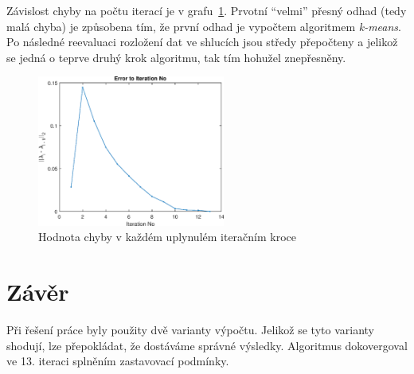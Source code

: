 Závislost chyby na počtu iterací je v grafu~\ref{fig:result4}.
Prvotní \enquote{velmi} přesný odhad (tedy malá chyba) je způsobena tím, že první odhad je vypočtem algoritmem \textit{k-means}.
Po následné reevaluaci rozložení dat ve shlucích jsou středy přepočteny a jelikož se jedná o teprve druhý krok algoritmu, tak tím hohužel znepřesněny.

\begin{figure}[htb]
    \centering
    \includegraphics[width=0.55\textwidth]{graphs/fig4.eps}
    \caption{Hodnota chyby v každém uplynulém iteračním kroce}
    \label{fig:result4}
\end{figure}
\FloatBarrier

\section{Závěr}

Při řešení práce byly použity dvě varianty výpočtu.
Jelikož se tyto varianty shodují, lze přepokládat, že dostáváme správné výsledky.
Algoritmus dokovergoval ve 13. iteraci splněním zastavovací podmínky.
